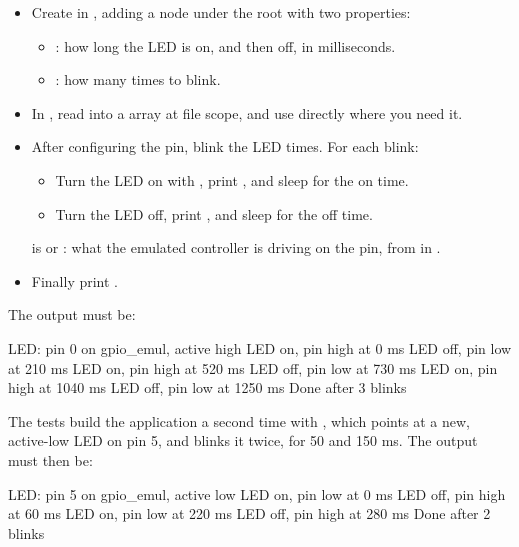 \begin{itemize}
  \item Create  in , adding a  node under the root with
    two properties:
\begin{itemize}
  \item {}: how long the LED is on, and then off, in milliseconds.
  \item {}: how many times to blink.
\end{itemize}
  \item In , read  into a  array at file scope, and use
     directly where you need it.
  \item After configuring the pin, blink the LED  times. For each blink:
\begin{itemize}
  \item Turn the LED on with , print , and
    sleep for the on time.
  \item Turn the LED off, print , and sleep for the off time.
\end{itemize}
 is  or : what the emulated controller is driving on the pin,
from  in .
  \item Finally print .
\end{itemize}

The output must be:

\begin{console}
LED: pin 0 on gpio_emul, active high
LED on, pin high at 0 ms
LED off, pin low at 210 ms
LED on, pin high at 520 ms
LED off, pin low at 730 ms
LED on, pin high at 1040 ms
LED off, pin low at 1250 ms
Done after 3 blinks
\end{console}

\noindent The tests build the application a second time with
, which points  at a new,
active-low LED on pin 5, and blinks it twice, for 50 and 150 ms. The output must then be:

\begin{console}
LED: pin 5 on gpio_emul, active low
LED on, pin low at 0 ms
LED off, pin high at 60 ms
LED on, pin low at 220 ms
LED off, pin high at 280 ms
Done after 2 blinks
\end{console}

